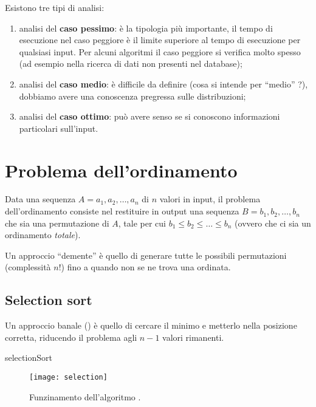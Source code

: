 Esistono tre tipi di analisi:
\begin{enumerate}
	\item analisi del \textbf{caso pessimo}: è la tipologia più importante, il tempo di esecuzione nel caso peggiore è il limite superiore al tempo di esecuzione per qualsiasi input. Per alcuni algoritmi il caso peggiore si verifica molto spesso (ad esempio nella ricerca di dati non presenti nel database);
	\item analisi del \textbf{caso medio}: è difficile da definire (cosa si intende per \enquote{medio} ?), dobbiamo avere una conoscenza pregressa sulle distribuzioni;
	\item analisi del \textbf{caso ottimo}: può avere senso se si conoscono informazioni particolari sull'input.
\end{enumerate}

\section*{Problema dell'ordinamento}

Data una sequenza \(A = a_1, a_2, \dots, a_n\) di \(n\) valori in input, il problema dell'ordinamento consiste nel restituire in output una sequenza \(B = b_1, b_2, \dots, b_n\) che sia una permutazione di \(A\), tale per cui \mbox{\(b_1 \leqslant b_2 \leqslant \dots \leqslant b_n\)} (ovvero che ci sia un ordinamento \emph{totale}).

Un approccio \enquote{demente} è quello di generare tutte le possibili permutazioni (complessità \(n!\)) fino a quando non se ne trova una ordinata.

\clearpage
\subsection{Selection sort}

Un approccio banale () è quello di cercare il minimo e metterlo nella posizione corretta, riducendo il problema agli \(n-1\) valori rimanenti.

\begin{algorithm}[H]
	\caption{selectionSort}
	
\end{algorithm}

\begin{figure}[H]\centering
	\texttt{[image: selection]}
	\caption[]{Funzinamento dell'algoritmo \selectionSort.}
\end{figure}


